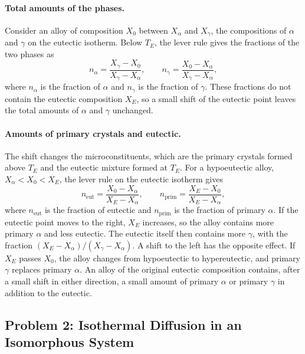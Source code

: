 \documentclass[11pt]{article}      %
\numberwithin{equation}{section}   %
\begin{document}
\paragraph{Total amounts of the phases.}
Consider an alloy of composition $X_0$ between $X_\alpha$ and $X_\gamma$, the compositions of $\alpha$ and $\gamma$ on the eutectic isotherm.
Below $T_E$, the lever rule gives the fractions of the two phases as
\begin{equation}
    n_\alpha = \frac{X_\gamma - X_0}{X_\gamma - X_\alpha},
    \qquad
    n_\gamma = \frac{X_0 - X_\alpha}{X_\gamma - X_\alpha},
\end{equation}
where $n_\alpha$ is the fraction of $\alpha$ and $n_\gamma$ is the fraction of $\gamma$.
These fractions do not contain the eutectic composition $X_E$, so a small shift of the eutectic point leaves the total amounts of $\alpha$ and $\gamma$ unchanged.

\paragraph{Amounts of primary crystals and eutectic.}
The shift changes the microconstituents, which are the primary crystals formed above $T_E$ and the eutectic mixture formed at $T_E$.
For a hypoeutectic alloy, $X_\alpha < X_0 < X_E$, the lever rule on the eutectic isotherm gives
\begin{equation}
    n_{\text{eut}} = \frac{X_0 - X_\alpha}{X_E - X_\alpha},
    \qquad
    n_{\text{prim}} = \frac{X_E - X_0}{X_E - X_\alpha},
\end{equation}
where $n_{\text{eut}}$ is the fraction of eutectic and $n_{\text{prim}}$ is the fraction of primary $\alpha$.
If the eutectic point moves to the right, $X_E$ increases, so the alloy contains more primary $\alpha$ and less eutectic.
The eutectic itself then contains more $\gamma$, with the fraction $(X_E - X_\alpha)/(X_\gamma - X_\alpha)$.
A shift to the left has the opposite effect.
If $X_E$ passes $X_0$, the alloy changes from hypoeutectic to hypereutectic, and primary $\gamma$ replaces primary $\alpha$.
An alloy of the original eutectic composition contains, after a small shift in either direction, a small amount of primary $\alpha$ or primary $\gamma$ in addition to the eutectic.

\subsection{Problem 2: Isothermal Diffusion in an Isomorphous System}
\end{document}
